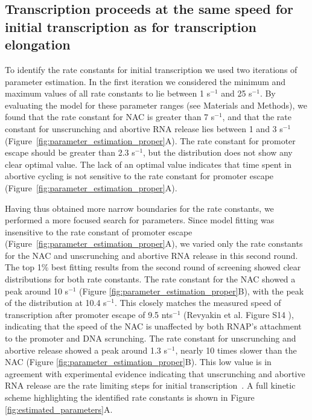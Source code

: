 %
\subsection{Transcription proceeds at the same speed for initial transcription
as for transcription elongation}

To identify the rate constants for initial transcription we used two
iterations of parameter estimation. In the first iteration we considered the
minimum and maximum values of all rate constants to lie between 1 s$^{-1}$ and
25 s$^{-1}$. By evaluating the model for these parameter ranges (see Materials
and Methods), we found that the rate constant for NAC is greater than 7
s$^{-1}$, and that the rate constant for unscrunching and abortive RNA release
lies between 1 and 3 s$^{-1}$ (Figure~\ref{fig:parameter_estimation_proper}A).
The rate constant for promoter escape should be greater than 2.3 s$^{-1}$, but
the distribution does not show any clear optimal value. The lack of an optimal
value indicates that time spent in abortive cycling is not sensitive to the
rate constant for promoter escape
(Figure~\ref{fig:parameter_estimation_proper}A).

Having thus obtained more narrow boundaries for the rate constants, we
performed a more focused search for parameters. Since model fitting was
insensitive to the rate constant of promoter escape
(Figure~\ref{fig:parameter_estimation_proper}A), we varied only the rate
constants for the NAC and unscrunching and abortive RNA release in this second
round. The top 1\% best fitting results from the second round of screening
showed clear distributions for both rate constants.  The rate constant for the
NAC showed a peak around 10 s$^{-1}$ (Figure
\ref{fig:parameter_estimation_proper}B), with the peak of the distribution at
10.4 s$^{-1}$. This closely matches the
measured speed of transcription after promoter escape of 9.5 nts$^{-1}$
(Revyakin et al. Figure S14 \cite{revyakin_abortive_2006}), indicating that
the speed of the NAC is unaffected by both RNAP's attachment to the promoter
and DNA scrunching. The rate constant for unscrunching and abortive release
showed a peak around 1.3 s$^{-1}$, nearly 10 times slower than the NAC (Figure
\ref{fig:parameter_estimation_proper}B).  This low value is in agreement with
experimental evidence indicating that unscrunching and abortive RNA release
are the rate limiting steps for initial
transcription~\cite{revyakin_abortive_2006, margeat_direct_2006}. A full
kinetic scheme highlighting the identified rate constants is shown in Figure
\ref{fig:estimated_parameters}A.

